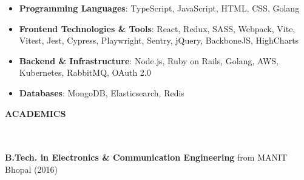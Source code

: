 \documentclass[a4paper,11pt]{article}
\newcommand{\lsep}{-0.5cm}
\newcommand{\resheading}[1]{{\small \colorbox{mygrey}{\begin{minipage}{0.975\textwidth}{\textbf{#1 \vphantom{p\^{E}}}}\end{minipage}}}}
\begin{document}
\vspace{0.05cm}
\begin{itemize}
  \item \textbf{Programming Languages}: TypeScript, JavaScript, HTML, CSS, Golang \\[-0.6cm]
  \item \textbf{Frontend Technologies \& Tools}: React, Redux, SASS, Webpack, Vite, Vitest, Jest, Cypress, Playwright, Sentry, jQuery, BackboneJS, HighCharts\\[-0.6cm]
  \item \textbf{Backend \& Infrastructure}: Node.js, Ruby on Rails, Golang, AWS, Kubernetes, RabbitMQ, OAuth 2.0\\[-0.6cm]
  \item \textbf{Databases}: MongoDB, Elasticsearch, Redis\\[-0.6cm]
\end{itemize}

\vspace{0.2cm}
\resheading{\textbf{\large ACADEMICS} }\\\\[\lsep]

\vspace{0.02cm}
\textbf{B.Tech. in Electronics \& Communication Engineering} from MANIT Bhopal (2016)
\end{document}
